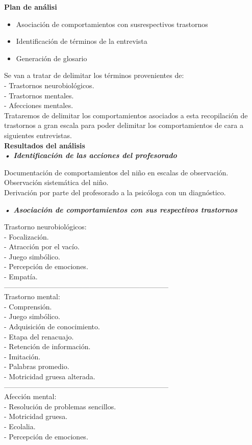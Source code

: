 \documentclass[letterpaper,12pt]{article}
\begin{document}
\textbf{Plan de análisi} \\
\begin{itemize}
    \item Asociación de comportamientos con susrespectivos trastornos
    \item Identificación de términos de la entrevista
    \item Generación de glosario
\end{itemize}
Se van a tratar de delimitar los términos provenientes de:\\
- Trastornos neurobiológicos.\\
- Trastornos mentales.\\
- Afecciones mentales.\\
Trataremos de delimitar los comportamientos asociados a esta
recopilación de trastornos a gran escala para poder delimitar los
comportamientos de cara a siguientes entrevistas. \\
\textbf{Resultados del análisis} \\
\textit{\textbf{• Identificación de las acciones del profesorado}}
\begin{flushleft}
Documentación de comportamientos del niño en escalas de observación. \\
Observación sistemática del niño. \\
Derivación por parte del profesorado a la psicóloga con un diagnóstico. \\
\end{flushleft}
\textit{\textbf{• Asociación de comportamientos con sus respectivos trastornos}}

Trastorno neurobiológicos: \\
- Focalización. \\
- Atracción por el vacío. \\
- Juego simbólico. \\
- Percepción de emociones. \\
- Empatía. \\
--------------------------------------------------------------------- \\
Trastorno mental: \\
- Comprensión. \\
- Juego simbólico. \\
- Adquisición de conocimiento. \\
- Etapa del renacuajo. \\
- Retención de información. \\
- Imitación. \\
- Palabras promedio. \\
- Motricidad gruesa alterada. \\
--------------------------------------------------------------------- \\
Afección mental: \\
- Resolución de problemas sencillos.\\
- Motricidad gruesa.\\
- Ecolalia.\\
- Percepción de emociones.\\
\end{document}
